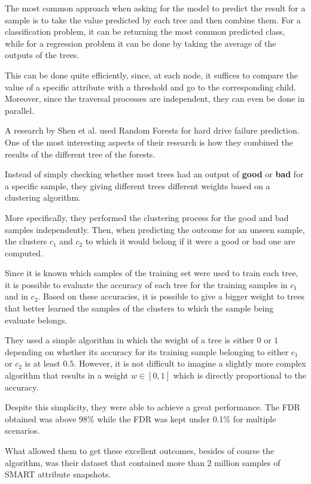 The most common approach when asking for the model to predict the result for a sample is to take the value predicted by each tree and then combine them.
For a classification problem, it can be returning the most common predicted class, while for a regression problem it can be done by taking the average of the outputs of the trees.

This can be done quite efficiently, since, at each node, it suffices to compare the value of a specific attribute with a threshold and go to the corresponding child.
Moreover, since the traversal processes are independent, they can even be done in parallel.

A research by Shen et al. \cite{Shen18} used Random Forests for hard drive failure prediction.
One of the most interesting aspects of their research is how they combined the results of the different tree of the forests.

Instead of simply checking whether most trees had an output of \textbf{good} or \textbf{bad} for a specific sample, they giving different trees different weights based on a clustering algorithm.

More specifically, they performed the clustering process for the good and bad samples independently.
Then, when predicting the outcome for an unseen sample, the clusters $c_1$ and $c_2$ to which it would belong if it were a good or bad one are computed.

Since it is known which samples of the training set were used to train each tree, it is possible to evaluate the accuracy of each tree for the training samples in $c_1$ and in $c_2$.
Based on these accuracies, it is possible to give a bigger weight to trees that better learned the samples of the clusters to which the sample being evaluate belongs.

They used a simple algorithm in which the weight of a tree is either $0$ or $1$ depending on whether its accuracy for its training sample belonging to either $c_1$ or $c_2$ is at least $0.5$.
However, it is not difficult to imagine a slightly more complex algorithm that results in a weight $w \in \left[0,1\right]$ which is directly proportional to the accuracy.

Despite this simplicity, they were able to achieve a great performance.
The FDR obtained was above 98\% while the FDR was kept under 0.1\% for multiple scenarios.

What allowed them to get these excellent outcomes, besides of course the algorithm, was their dataset that contained more than 2 million samples of SMART attribute snapshots.

